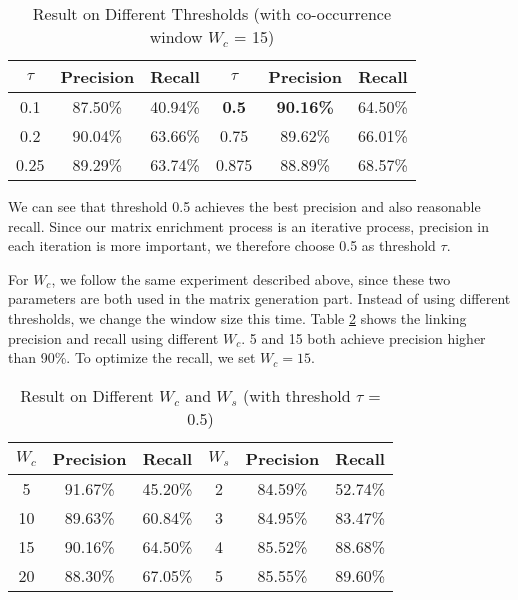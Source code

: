 \begin{table}[th]
\centering
\begin{tabular}{|c|c|c||c|c|c|}
\hline
$\tau$ & Precision & Recall & $\tau$ & Precision & Recall \\
\hline \hline
0.1 & 87.50\% & 40.94\% & \bf{0.5} & \bf{90.16\%} & 64.50\% \\
0.2 & 90.04\% & 63.66\% & 0.75 & 89.62\% & 66.01\% \\
0.25 & 89.29\% & 63.74\% & 0.875 & 88.89\% & 68.57\% \\
\hline
\end{tabular}
\caption{Result on Different Thresholds (with co-occurrence window $W_c$ = 15)}
\label{tab:theshold}
\end{table}
We can see that threshold 0.5 achieves the best precision and also
reasonable recall. Since our matrix enrichment process is an
iterative process, precision in each iteration is more important, we
therefore choose 0.5 as threshold $\tau$.

For $W_c$, we follow the same experiment described above,
since these two parameters are both used in the matrix generation part.
Instead of using different thresholds, we change the window size this
time. Table \ref{tab:window} shows the linking precision and recall 
using different $W_c$. 5 and 15 both achieve precision
higher than 90\%. To optimize the recall, we set $W_c = 15$.

\begin{table}[th]
\centering
\begin{tabular}{|c|c|c||c|c|c|}
\hline
$W_c$ & Precision & Recall & $W_s$ & Precision & Recall \\
\hline \hline
5 & 91.67\% & 45.20\% & 2 &84.59\%&	52.74\% \\
10 & 89.63\% & 60.84\% & 3 &84.95\%& 83.47\% \\
15 & 90.16\% & 64.50\% & 4 &85.52\%& 88.68\% \\
20 & 88.30\% & 67.05\% & 5 &85.55\%& 89.60\% \\
\hline
\end{tabular}
\caption{Result on Different $W_c$ and $W_s$ (with threshold $\tau$ = 0.5)}
\label{tab:window}
\end{table}

